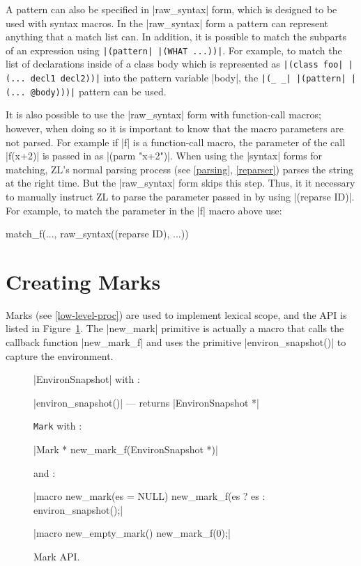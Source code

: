 A pattern can also be specified in |raw_syntax| form, which is designed
to be used with syntax macros.  In the |raw_syntax| form a pattern
can represent anything that a match list can.  
In addition, it is possible to match the subparts of
an expression using {\tt |(pattern| |(WHAT ...))|}.  For example, to
match the list of declarations inside of a class body which is
represented as {\tt |(class foo| |({...} decl1 decl2))|} into the
pattern variable |body|, the {\tt |(_ _| |(pattern| |({...} @body)))|}
pattern can be used.

It is also possible to use the |raw_syntax| form with function-call
macros; however, when doing so it is important to know that the macro
parameters are not parsed.  For example if |f| is a function-call
macro, the parameter of the call |f(x+2)| is passed in as 
|(parm "x+2")|. When using the |syntax| forms for matching, ZL's normal parsing
process (see \ref{parsing}, \ref{reparser}) parses the string at
the right time.  But the |raw_syntax| form skips this step.  Thus, it
it necessary to manually instruct ZL to parse the parameter passed in by
using |(reparse ID)|.  For example, to match the parameter in the |f|
macro above use:%
\begin{code}
match_f(..., raw_syntax((reparse ID), ...))
\end{code}

\section{Creating Marks}
\label{marks}

Marks (see \ref{low-level-proc}) are used to implement lexical scope, and
the API is listed in Figure~\ref{mark-api}.  The |new_mark| primitive
is actually a macro that calls the callback function
|new_mark_f| and uses the primitive |environ_snapshot()| to capture
the environment.

\begin{figure}
\begin{apil}
\item {} |EnvironSnapshot| with :
\begin{apill}
\item |environ_snapshot()| --- returns |EnvironSnapshot *|
\end{apill}
\item {} \verb/Mark/ with :
\begin{apill}
\item |Mark * new_mark_f(EnvironSnapshot *)|
\end{apill}
and :
\begin{apill}
\item |macro new_mark(es = NULL) {new_mark_f(es ? es : environ_snapshot();}|
\item |macro new_empty_mark() {new_mark_f(0);}|
\end{apill}
\end{apil}
\caption{Mark API.}
\label{mark-api}
\end{figure}

